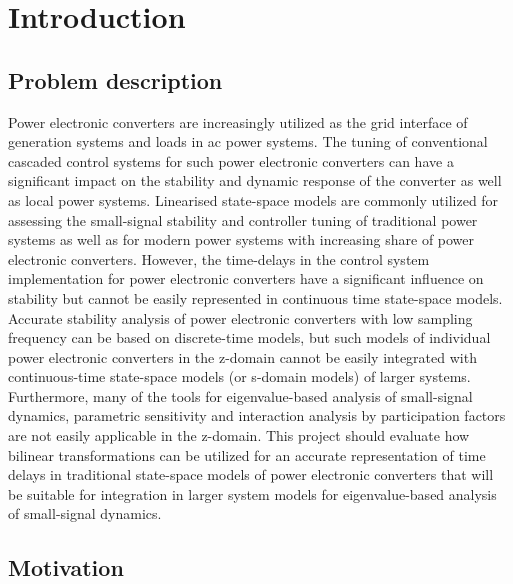 \chapter{Introduction}


\section{Problem description} %
Power electronic converters are increasingly utilized as the grid interface of generation systems and loads in ac power systems. The tuning of conventional cascaded control systems for such power electronic converters can have a significant impact on the stability and dynamic response of the converter as well as local power systems. Linearised state-space models are commonly utilized for assessing the small-signal stability and controller tuning of traditional power systems as well as for modern power systems with increasing share of power electronic converters. However, the time-delays in the control system implementation for power electronic converters have a significant influence on stability but cannot be easily represented in continuous time state-space models. Accurate stability analysis of power electronic converters with low sampling frequency can be based on discrete-time models, but such models of individual power electronic converters in the z-domain cannot be easily integrated with continuous-time state-space models (or s-domain models) of larger systems. Furthermore, many of the tools for eigenvalue-based analysis of small-signal dynamics, parametric sensitivity and interaction analysis by participation factors are not easily applicable in the z-domain. This project should evaluate how bilinear transformations can be utilized for an accurate representation of time delays in traditional state-space models of power electronic converters that will be suitable for integration in larger system models for eigenvalue-based analysis of small-signal dynamics.


\section{Motivation}

